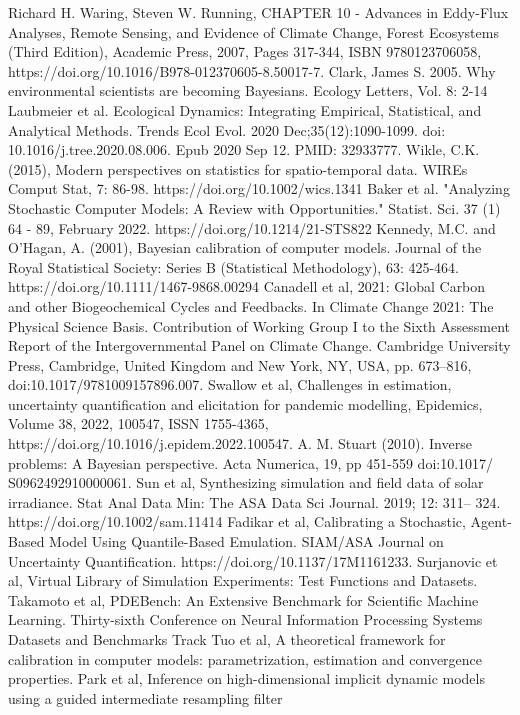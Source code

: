\documentclass[12pt]{article}
\begin{document}
\begin{thebibliography}{20}
 Richard H. Waring, Steven W. Running, CHAPTER 10 - Advances in Eddy-Flux Analyses, Remote Sensing, and Evidence of Climate Change, Forest Ecosystems (Third Edition), Academic Press, 2007, Pages 317-344, ISBN 9780123706058, https://doi.org/10.1016/B978-012370605-8.50017-7.
 Clark, James S. 2005. Why environmental scientists are becoming Bayesians. Ecology Letters, Vol. 8: 2-14
 Laubmeier et al. Ecological Dynamics: Integrating Empirical, Statistical, and Analytical Methods. Trends Ecol Evol. 2020 Dec;35(12):1090-1099. doi: 10.1016/j.tree.2020.08.006. Epub 2020 Sep 12. PMID: 32933777.
 Wikle, C.K. (2015), Modern perspectives on statistics for spatio-temporal data. WIREs Comput Stat, 7: 86-98. https://doi.org/10.1002/wics.1341
 Baker et al. "Analyzing Stochastic Computer Models: A Review with Opportunities." Statist. Sci. 37 (1) 64 - 89, February 2022. https://doi.org/10.1214/21-STS822
 Kennedy, M.C. and O'Hagan, A. (2001), Bayesian calibration of computer models. Journal of the Royal Statistical Society: Series B (Statistical Methodology), 63: 425-464. https://doi.org/10.1111/1467-9868.00294
 Canadell et al, 2021: Global Carbon and
other Biogeochemical Cycles and Feedbacks. In Climate Change 2021: The Physical Science Basis. Contribution of
Working Group I to the Sixth Assessment Report of the Intergovernmental Panel on Climate Change. Cambridge University Press,
Cambridge, United Kingdom and New York, NY, USA, pp. 673–816, doi:10.1017/9781009157896.007.
 Swallow et al, Challenges in estimation, uncertainty quantification and elicitation for pandemic modelling, Epidemics, Volume 38, 2022, 100547, ISSN 1755-4365, https://doi.org/10.1016/j.epidem.2022.100547.
 A. M. Stuart (2010). Inverse problems: A Bayesian perspective. Acta Numerica, 19, pp 451-559 doi:10.1017/
S0962492910000061.
 Sun et al, Synthesizing simulation and field data of solar irradiance. Stat Anal Data Min: The ASA Data Sci Journal. 2019; 12: 311– 324. https://doi.org/10.1002/sam.11414
 Fadikar et al, Calibrating a Stochastic, Agent-Based Model Using Quantile-Based Emulation. SIAM/ASA Journal on Uncertainty Quantification. https://doi.org/10.1137/17M1161233.
 Surjanovic et al, Virtual Library of Simulation Experiments: Test Functions and Datasets.
 Takamoto et al, PDEBench: An Extensive Benchmark for Scientific Machine Learning. Thirty-sixth Conference on Neural Information Processing Systems Datasets and Benchmarks Track
 Tuo et al, A theoretical framework for calibration in computer models: parametrization, estimation and convergence properties. 
 Park et al, Inference on high-dimensional implicit dynamic models using a guided intermediate resampling filter

\end{thebibliography}
\end{document}
